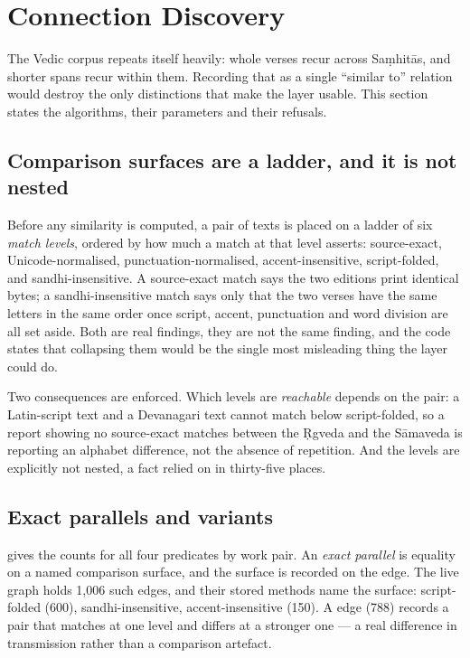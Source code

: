 \section{Connection Discovery}
\label{sec:connections}

The Vedic corpus repeats itself heavily: whole verses recur across Sa\d{m}hit\=as, and
shorter spans recur within them. Recording that as a single ``similar to'' relation
would destroy the only distinctions that make the layer usable. This section states
the algorithms, their parameters and their refusals.

\subsection{Comparison surfaces are a ladder, and it is not nested}
\label{sec:ladder}

Before any similarity is computed, a pair of texts is placed on a ladder of six
\emph{match levels}, ordered by how much a match at that level asserts:
source-exact, Unicode-normalised, punctuation-normalised, accent-insensitive,
script-folded, and sandhi-insensitive. A source-exact match says the two editions
print identical bytes; a sandhi-insensitive match says only that the two verses have
the same letters in the same order once script, accent, punctuation and word
division are all set aside. Both are real findings, they are not the same finding,
and the code states that collapsing them would be the single most misleading thing
the layer could do.

Two consequences are enforced. Which levels are \emph{reachable} depends on the
pair: a Latin-script text and a Devanagari text cannot match below script-folded, so
a report showing no source-exact matches between the \d{R}gveda and the S\=amaveda is
reporting an alphabet difference, not the absence of repetition. And the levels are
explicitly not nested, a fact relied on in thirty-five places.

\subsection{Exact parallels and variants}

 gives the counts for all four predicates by work pair.
An \emph{exact parallel} is equality on a named comparison surface, and the surface
is recorded on the edge. The live graph holds 1{,}006 such edges, and their stored
methods name the surface: script-folded (600), sandhi-insensitive, accent-insensitive
(150). A  edge (788) records a pair that matches at one level and
differs at a stronger one --- a real difference in transmission rather than a
comparison artefact.

